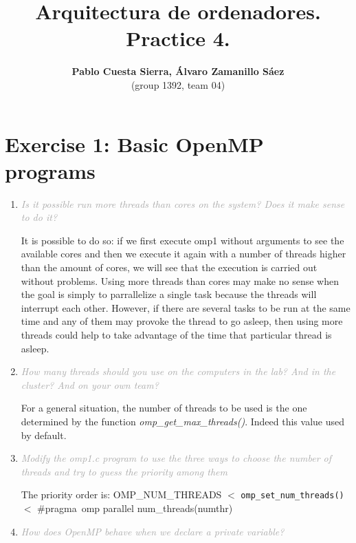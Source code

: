\documentclass{article}
\newcommand{\greyItem}[1]{\item\emph{\textcolor{darkgray}{#1}}}
\begin{document}
\title{\textbf{Arquitectura de ordenadores. Practice 4.}}
\author{\textbf{Pablo Cuesta Sierra, Álvaro Zamanillo Sáez}\\(group 1392, team 04)}
\maketitle

\begin{tcolorbox}
\tableofcontents
\end{tcolorbox}


\newpage
\section{Exercise 1: Basic OpenMP programs}

\begin{enumerate}[label=1.\arabic*,leftmargin=*]
\greyItem{Is it possible run more threads than cores on the system? Does it make sense to do it?}

It is possible to do so: if we first execute omp1 without arguments to see the available cores and then we execute it again with a number of threads higher than the amount of cores, we will see that the execution is carried out without problems. Using more threads than cores may make no sense when the goal is simply to parrallelize a single task because the threads will interrupt each other. However, if there are several tasks to be run at the same time and any of them may provoke the thread to go asleep, then using more threads could help to take advantage of the time that particular thread is asleep. 


\greyItem{How many threads should you use on the computers in the lab? And in the cluster? And on your own team?} 

For a general situation, the number of threads to be used is the one determined by the function \emph{omp\_get\_max\_threads()}. Indeed this value used by default.

\greyItem{Modify the omp1.c program to use the three ways to choose the number of threads and try to guess the priority among them}

The priority order is: \texttt{}{OMP\_NUM\_THREADS} $<$ \texttt{omp\_set\_num\_threads()} $<$ \#pragma\ omp parallel num\_threads(numthr) 

\greyItem{How does OpenMP behave when we declare a private variable?}


\end{enumerate}
\end{document}

